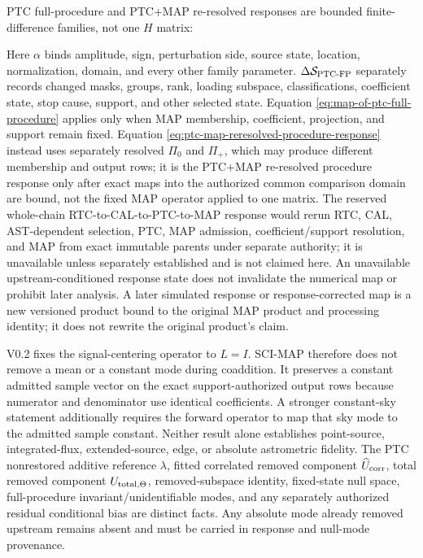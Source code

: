 \documentclass[10pt]{article}
\begin{document}
PTC full-procedure and PTC+MAP re-resolved responses are bounded
finite-difference families, not one \(H\) matrix:

\SCIMapProcedureResponseEquations

\SCIMapComparisonSpaceDefinition

Here \(\alpha\) binds amplitude, sign, perturbation side, source state,
location, normalization, domain, and every other family parameter.
\(\Delta\mathcal S_{{\rm PTC}\text{-}{\rm FP}}\) separately
records changed masks, groups, rank, loading subspace, classifications,
coefficient state, stop cause, support, and other selected state. Equation
\eqref{eq:map-of-ptc-full-procedure} applies only when MAP membership,
coefficient, projection, and support remain fixed. Equation
\eqref{eq:ptc-map-reresolved-procedure-response} instead uses separately
resolved \(\Pi_0\) and \(\Pi_+\), which may produce different membership and
output rows; it is the PTC+MAP re-resolved procedure response only after exact
maps into the authorized common comparison domain are bound, not the fixed MAP
operator applied to one matrix. The reserved
whole-chain RTC-to-CAL-to-PTC-to-MAP response would rerun RTC, CAL,
AST-dependent selection, PTC, MAP admission, coefficient/support resolution,
and MAP from exact immutable parents under separate authority; it is
unavailable unless separately established and is not claimed here. An
unavailable upstream-conditioned response state does not invalidate the numerical map
or prohibit later analysis. A
later simulated response or response-corrected map is a new versioned product
bound to the original MAP product and processing identity; it does not rewrite
the original product's claim.

V0.2 fixes the signal-centering operator to \(L=I\). SCI-MAP therefore does not
remove a mean or a constant mode during coaddition. It preserves a constant
admitted sample vector on the exact support-authorized output rows because
numerator and denominator use identical coefficients. A stronger constant-sky
statement additionally requires the forward operator to map that sky mode to
the admitted sample constant. Neither result alone establishes point-source,
integrated-flux, extended-source, edge, or absolute astrometric fidelity. The
PTC nonrestored additive reference \(\lambda\), fitted correlated removed
component \(\widehat U_{\rm corr}\), total removed component
\(U_{{\rm total},\Theta}\), removed-subspace identity, fixed-state null space,
full-procedure invariant/unidentifiable modes, and any separately authorized
residual conditional bias are distinct facts. Any absolute mode already
removed upstream remains absent and must be carried in response and null-mode
provenance.
\end{document}
